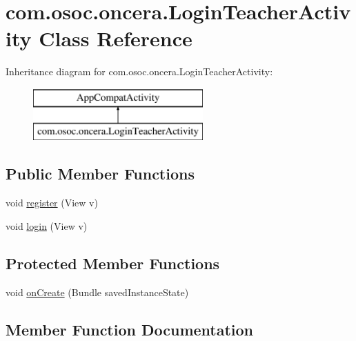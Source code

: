 \hypertarget{classcom_1_1osoc_1_1oncera_1_1_login_teacher_activity}{}\section{com.\+osoc.\+oncera.\+Login\+Teacher\+Activity Class Reference}
\label{classcom_1_1osoc_1_1oncera_1_1_login_teacher_activity}
Inheritance diagram for com.\+osoc.\+oncera.\+Login\+Teacher\+Activity\+:\begin{figure}[H]
\begin{center}
\leavevmode
\includegraphics[height=2.000000cm]{classcom_1_1osoc_1_1oncera_1_1_login_teacher_activity}
\end{center}
\end{figure}
\subsection*{Public Member Functions}
\begin{DoxyCompactItemize}
\item 
void \mbox{\hyperlink{classcom_1_1osoc_1_1oncera_1_1_login_teacher_activity_a1045d9fd21387400e0a14dbf9a7b41cc}{register}} (View v)
\item 
void \mbox{\hyperlink{classcom_1_1osoc_1_1oncera_1_1_login_teacher_activity_a8471aa9b1605a0733ae56abe67a99d02}{login}} (View v)
\end{DoxyCompactItemize}
\subsection*{Protected Member Functions}
\begin{DoxyCompactItemize}
\item 
void \mbox{\hyperlink{classcom_1_1osoc_1_1oncera_1_1_login_teacher_activity_af246f6a1292bb01afae15c9254184a69}{on\+Create}} (Bundle saved\+Instance\+State)
\end{DoxyCompactItemize}


\subsection{Member Function Documentation}
\mbox{\label{classcom_1_1osoc_1_1oncera_1_1_login_teacher_activity_a8471aa9b1605a0733ae56abe67a99d02}} 
